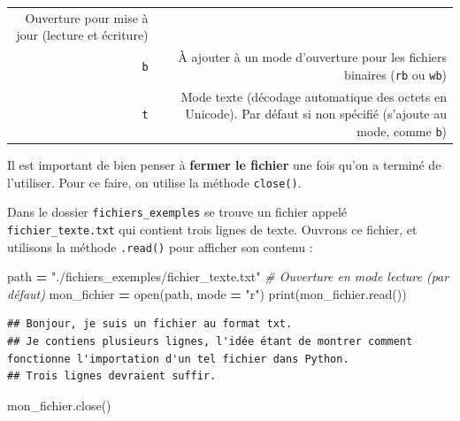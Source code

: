 \documentclass[12pt,]{book}
\newenvironment{Shaded}{\begin{snugshade}}{\end{snugshade}}
\newcommand{\StringTok}[1]{\textcolor[rgb]{0.31,0.60,0.02}{#1}}
\newcommand{\CommentTok}[1]{\textcolor[rgb]{0.56,0.35,0.01}{\textit{#1}}}
\newcommand{\OperatorTok}[1]{\textcolor[rgb]{0.81,0.36,0.00}{\textbf{#1}}}
\newcommand{\BuiltInTok}[1]{#1}
\newcommand{\NormalTok}[1]{#1}
\numberwithin{equation}{section}
\numberwithin{countremarque}{section}
\begin{document}
\begin{longtable}[]{@{}rr@{}}
\begin{minipage}[t]{0.61\columnwidth}
Ouverture pour mise à jour (lecture et écriture)\strut
\end{minipage}\tabularnewline
\begin{minipage}[t]{0.12\columnwidth}\raggedleft\strut
\texttt{b}\strut
\end{minipage} & \begin{minipage}[t]{0.61\columnwidth}\raggedleft\strut
À ajouter à un mode d'ouverture pour les fichiers binaires (\texttt{rb}
ou \texttt{wb})\strut
\end{minipage}\tabularnewline
\begin{minipage}[t]{0.12\columnwidth}\raggedleft\strut
\texttt{t}\strut
\end{minipage} & \begin{minipage}[t]{0.61\columnwidth}\raggedleft\strut
Mode texte (décodage automatique des octets en Unicode). Par défaut si
non spécifié (s'ajoute au mode, comme \texttt{b})\strut
\end{minipage}\tabularnewline
\bottomrule
\end{longtable}

Il est important de bien penser à \textbf{fermer le fichier} une fois
qu'on a terminé de l'utiliser. Pour ce faire, on utilise la méthode
\texttt{close()}.

Dans le dossier \texttt{fichiers\_exemples} se trouve un fichier appelé
\texttt{fichier\_texte.txt} qui contient trois lignes de texte. Ouvrons
ce fichier, et utilisons la méthode \texttt{.read()} pour afficher son
contenu :

\begin{Shaded}
\begin{Highlighting}[]
\NormalTok{path }\OperatorTok{=} \StringTok{"./fichiers_exemples/fichier_texte.txt"}
\CommentTok{# Ouverture en mode lecture (par défaut)}
\NormalTok{mon_fichier }\OperatorTok{=} \BuiltInTok{open}\NormalTok{(path, mode }\OperatorTok{=} \StringTok{"r"}\NormalTok{)}
\BuiltInTok{print}\NormalTok{(mon_fichier.read())}
\end{Highlighting}
\end{Shaded}

\begin{lstlisting}
## Bonjour, je suis un fichier au format txt.
## Je contiens plusieurs lignes, l'idée étant de montrer comment fonctionne l'importation d'un tel fichier dans Python.
## Trois lignes devraient suffir.
\end{lstlisting}

\begin{Shaded}
\begin{Highlighting}[]
\NormalTok{mon_fichier.close()}
\end{Highlighting}
\end{Shaded}
\end{document}
